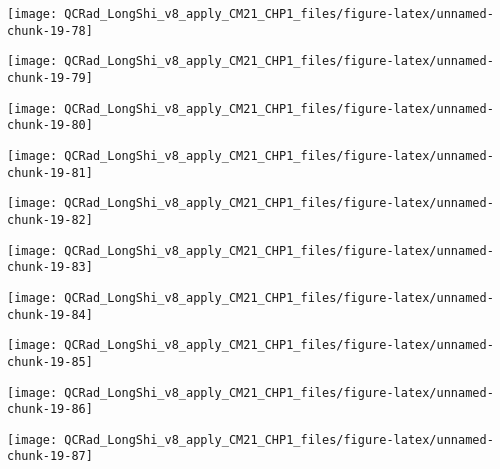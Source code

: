 \documentclass[
  10pt,
  a4paper,oneside]{article}
\begin{document}
\begin{center}\texttt{[image: QCRad\_LongShi\_v8\_apply\_CM21\_CHP1\_files/figure-latex/unnamed-chunk-19-78]} \end{center}

\begin{center}\texttt{[image: QCRad\_LongShi\_v8\_apply\_CM21\_CHP1\_files/figure-latex/unnamed-chunk-19-79]} \end{center}

\begin{center}\texttt{[image: QCRad\_LongShi\_v8\_apply\_CM21\_CHP1\_files/figure-latex/unnamed-chunk-19-80]} \end{center}

\begin{center}\texttt{[image: QCRad\_LongShi\_v8\_apply\_CM21\_CHP1\_files/figure-latex/unnamed-chunk-19-81]} \end{center}

\begin{center}\texttt{[image: QCRad\_LongShi\_v8\_apply\_CM21\_CHP1\_files/figure-latex/unnamed-chunk-19-82]} \end{center}

\begin{center}\texttt{[image: QCRad\_LongShi\_v8\_apply\_CM21\_CHP1\_files/figure-latex/unnamed-chunk-19-83]} \end{center}

\begin{center}\texttt{[image: QCRad\_LongShi\_v8\_apply\_CM21\_CHP1\_files/figure-latex/unnamed-chunk-19-84]} \end{center}

\begin{center}\texttt{[image: QCRad\_LongShi\_v8\_apply\_CM21\_CHP1\_files/figure-latex/unnamed-chunk-19-85]} \end{center}

\begin{center}\texttt{[image: QCRad\_LongShi\_v8\_apply\_CM21\_CHP1\_files/figure-latex/unnamed-chunk-19-86]} \end{center}

\begin{center}\texttt{[image: QCRad\_LongShi\_v8\_apply\_CM21\_CHP1\_files/figure-latex/unnamed-chunk-19-87]} \end{center}
\end{document}
